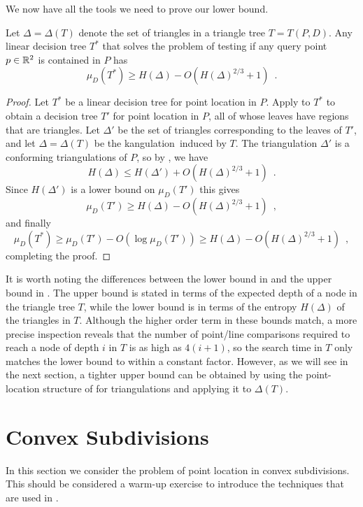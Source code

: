 \documentclass[charterfonts,lotsofwhite]{patmorin}
\newcommand{\kangulation}{kangulation}
\begin{document}
We now have all the tools we need to prove our lower bound.

\begin{lem}
Let $\Delta=\Delta(T)$ denote the set of triangles in a triangle tree
$T=T(P,D)$.
Any linear decision tree $T^*$ that solves the problem of testing 
if any query point 
$p\in\mathbb{R}^2$ is contained in $P$ has
\[
   \mu_D(T^*) \ge H(\Delta) - O(H(\Delta)^{2/3}+1) \enspace .
\]
\end{lem}

\begin{proof}
Let $T^*$ be a linear decision tree for point location in $P$.  Apply
 to $T^*$ to obtain a decision tree $T'$ for point
location in $P$, all of whose leaves have regions that are triangles.
Let $\Delta'$ be the set of triangles corresponding to the leaves of
$T'$, and let $\Delta=\Delta(T)$ be the \kangulation\ induced by
$T$.  The triangulation $\Delta'$ is a 
conforming triangulations of $P$, so by , we have
\[
    H(\Delta) \le H(\Delta')  + O(H(\Delta)^{2/3} + 1) \enspace .
\]
Since $H(\Delta')$ is a lower bound on $\mu_D(T')$ this gives
\[
   \mu_D(T') \ge H(\Delta) - O(H(\Delta)^{2/3} + 1) \enspace ,
\]
and finally
\[
   \mu_D(T^*) \ge \mu_D(T') - O(\log\mu_D(T'))
            \ge H(\Delta) - O(H(\Delta)^{2/3} + 1) \enspace ,
\]
completing the proof.
\end{proof}

It is worth noting the differences between the lower bound in
 and the upper bound in .  The
upper bound is stated in terms of the expected depth of a node in the
triangle tree $T$, while the lower bound is in terms of the entropy
$H(\Delta)$ of the triangles in $T$.  Although the higher order term
in these bounds match, a more precise inspection reveals that the
number of point/line comparisons required to reach a node of depth $i$
in $T$ is as high as $4(i+1)$, so the search time in $T$ only matches
the lower bound to within a constant factor.  However, as we will see
in the next section, a tighter upper bound can be obtained by using
the point-location structure of  for triangulations and
applying it to $\Delta(T)$. 

\section{Convex Subdivisions}

In this section we consider the problem of point location in convex
subdivisions.  This should be considered a warm-up exercise to
introduce the techniques that are used in .
\end{document}
